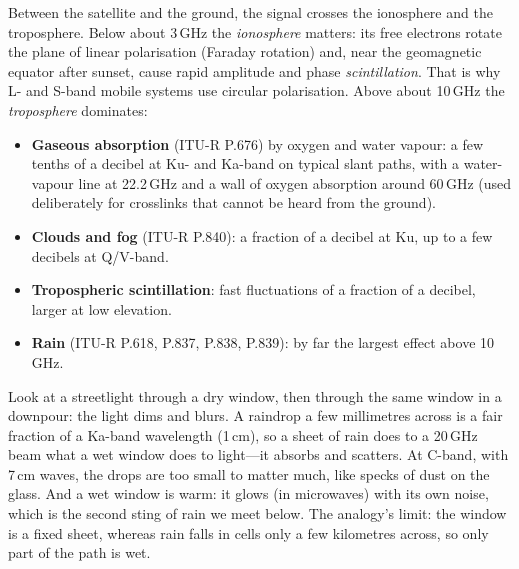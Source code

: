 Between the satellite and the ground, the signal crosses the ionosphere and the troposphere.
Below about 3\,GHz the \emph{ionosphere} matters: its free electrons rotate the plane of linear
polarisation (Faraday rotation) and, near the geomagnetic equator after sunset, cause rapid
amplitude and phase \emph{scintillation}. That is why L- and S-band mobile systems use circular
polarisation. Above about 10\,GHz the \emph{troposphere} dominates:
\begin{itemize}
\item \textbf{Gaseous absorption} (ITU-R P.676) by oxygen and water vapour: a few tenths of a
decibel at Ku- and Ka-band on typical slant paths, with a water-vapour line at 22.2\,GHz and a
wall of oxygen absorption around 60\,GHz (used deliberately for crosslinks that cannot be
heard from the ground).
\item \textbf{Clouds and fog} (ITU-R P.840): a fraction of a decibel at Ku, up to a few decibels
at Q/V-band.
\item \textbf{Tropospheric scintillation}: fast fluctuations of a fraction of a decibel, larger at
low elevation.
\item \textbf{Rain} (ITU-R P.618, P.837, P.838, P.839): by far the largest effect above 10\,GHz.
\end{itemize}


\begin{analogy}
Look at a streetlight through a dry window, then through the same window in a downpour: the light
dims and blurs. A raindrop a few millimetres across is a fair fraction of a Ka-band wavelength
(1\,cm), so a sheet of rain does to a 20\,GHz beam what a wet window does to light---it absorbs
and scatters. At C-band, with 7\,cm waves, the drops are too small to matter much, like specks of
dust on the glass. And a wet window is warm: it glows (in microwaves) with its own noise, which is
the second sting of rain we meet below. The analogy's limit: the window is a fixed sheet, whereas
rain falls in cells only a few kilometres across, so only part of the path is wet.
\end{analogy}

